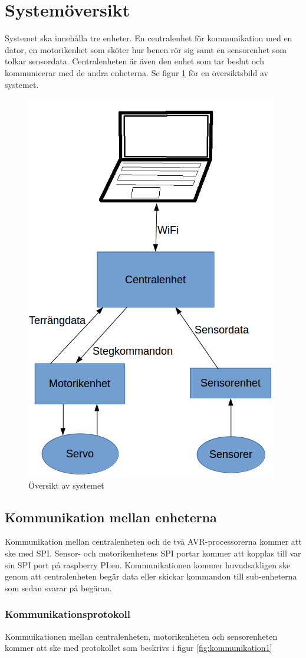 \documentclass[a4paper,titlepage,12pt]{article}
\begin{document}
	\section{Systemöversikt}
	Systemet ska innehålla tre enheter. En centralenhet för kommunikation med en
	dator, en motorikenhet som sköter hur benen rör sig samt en sensorenhet som
	tolkar sensordata. Centralenheten är även den enhet som tar beslut och
	kommunicerar med de andra enheterna. Se figur \ref{fig:overview} för en översiktsbild av
	systemet.
	\begin{figure}[h]
		\centering
		\includegraphics[width=0.5\linewidth]{../images/overview.png}
		\caption{Översikt av systemet\label{fig:overview}}
	\end{figure}

	\subsection{Kommunikation mellan enheterna}
	Kommunikation mellan centralenheten och de två AVR-processorerna kommer att ske
	med SPI. Sensor- och motorikenhetens SPI portar kommer att kopplas till var sin
	SPI port på raspberry PI:en. Kommunikationen kommer huvudsakligen ske genom  att
	centralenheten begär data eller skickar kommandon till sub-enheterna som
	sedan svarar på begäran.  

	\subsubsection{Kommunikationsprotokoll}
	\label{ssub:Kommunikationsprotokoll}
	Kommuikationen mellan centralenheten, motorikenheten och sensorenheten kommer att ske 
	med protokollet som beskrivs i figur \ref{fig:kommunikation1}
\end{document}
